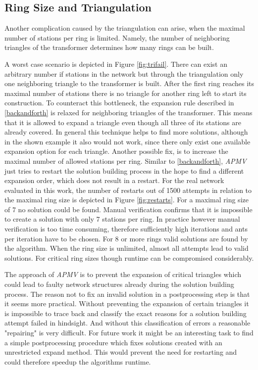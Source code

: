 \subsection{Ring Size and Triangulation}\label{sec:tri_problem}
Another complication caused by the triangulation can arise, when the maximal number of stations per ring is limited. Namely, the number of neighboring triangles of the transformer determines how many rings can be built.

A worst case scenario is depicted in Figure \ref{fig:trifail}. There can exist an arbitrary number if stations in the network but through the triangulation only one neighboring triangle to the transformer is built. After the first ring reaches its maximal number of stations there is no triangle for another ring left to start its construction. To counteract this bottleneck, the expansion rule described in \ref{backandforth} is relaxed for neighboring triangles of the transformer. This means that it is allowed to expand a triangle even though all three of its stations are already covered. In general this technique helps to find more solutions, although in the shown example it also would not work, since there only exist one available expansion option for each triangle. Another possible fix, is to increase the maximal number of allowed stations per ring. Similar to \ref{backandforth}, \textit{APMV} just tries to restart the solution building process in the hope to find a different expansion order, which does not result in a restart. For the real network evaluated in this work, the number of restarts out of 1500 attempts in relation to the maximal ring size is depicted in Figure \ref{fig:restarts}. For a maximal ring size of 7 no solution could be found. Manual verification confirms that it is impossible to create a solution with only 7 stations per ring. In practice however manual verification is too time consuming, therefore sufficiently high iterations and ants per iteration have to be chosen. For 8 or more rings valid solutions are found by the algorithm. When the ring size is unlimited, almost all attempts lead to valid solutions. For critical ring sizes though runtime can be compromised considerably.


The approach of \textit{APMV} is to prevent the expansion of critical triangles which could lead to faulty network structures already during the solution building process. The reason not to fix an invalid solution in a postprocessing step is that it seems more practical. Without preventing the expansion of certain triangles it is impossible to trace back and classify the exact reasons for a solution building attempt failed in hindsight. And without this classification of errors a reasonable "repairing" is very difficult. For future work it might be an interesting task to find a simple postprocessing procedure which fixes solutions created with an unrestricted expand method. This would prevent the need for restarting and could therefore speedup the algorithms runtime.

